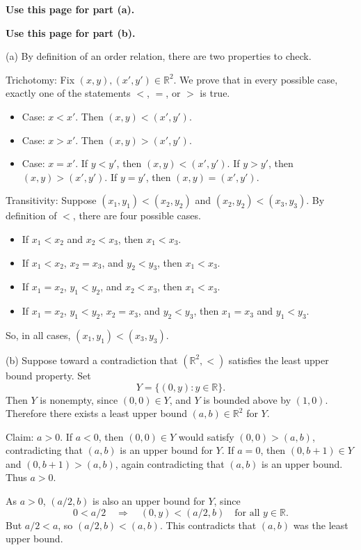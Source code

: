 \documentclass[12pt]{article}
\newcommand{\R}{\mathbb{R}}
\newcommand{\writespace}[1]{\vspace*{#1}}
\newcommand{\fullproofpage}[2]{%
  \begin{tcolorbox}[
    enhanced,
    colback=white,
    colframe=gray!60!black,
    fonttitle=\bfseries,
    title={Pass 5 -- Full Proof Attempt\hfill #1},
    height=8.45in
  ]
  \textbf{#2}

  \writespace{7.65in}
  \end{tcolorbox}
}
\newenvironment{solutionbox}[1]{%
  \begin{tcolorbox}[
    enhanced,
    breakable,
    colback=solgreen,
    colframe=green!45!black,
    fonttitle=\bfseries,
    title={#1}
  ]
}{%
  \end{tcolorbox}
}
\begin{document}
\newpage
\fullproofpage{Homework 3, Problem 2}{Use this page for part (a).}

\newpage
\fullproofpage{Homework 3, Problem 2}{Use this page for part (b).}

\newpage
\begin{solutionbox}{Official Solution (Professor)}
(a) By definition of an order relation, there are two properties to check.

Trichotomy: Fix \((x,y),(x',y')\in\R^2\). We prove that in every possible case, exactly one of the statements \(<\), \(=\), or \(>\) is true.
\begin{itemize}
  \item Case: \(x<x'\). Then \((x,y)<(x',y')\).
  \item Case: \(x>x'\). Then \((x,y)>(x',y')\).
  \item Case: \(x=x'\). If \(y<y'\), then \((x,y)<(x',y')\). If \(y>y'\), then \((x,y)>(x',y')\). If \(y=y'\), then \((x,y)=(x',y')\).
\end{itemize}

Transitivity: Suppose \((x_1,y_1)<(x_2,y_2)\) and \((x_2,y_2)<(x_3,y_3)\). By definition of \(<\), there are four possible cases.
\begin{itemize}
  \item If \(x_1<x_2\) and \(x_2<x_3\), then \(x_1<x_3\).
  \item If \(x_1<x_2\), \(x_2=x_3\), and \(y_2<y_3\), then \(x_1<x_3\).
  \item If \(x_1=x_2\), \(y_1<y_2\), and \(x_2<x_3\), then \(x_1<x_3\).
  \item If \(x_1=x_2\), \(y_1<y_2\), \(x_2=x_3\), and \(y_2<y_3\), then \(x_1=x_3\) and \(y_1<y_3\).
\end{itemize}
So, in all cases, \((x_1,y_1)<(x_3,y_3)\).

(b) Suppose toward a contradiction that \((\R^2,<)\) satisfies the least upper bound property. Set
\[
  Y=\{(0,y):y\in\R\}.
\]
Then \(Y\) is nonempty, since \((0,0)\in Y\), and \(Y\) is bounded above by \((1,0)\). Therefore there exists a least upper bound \((a,b)\in\R^2\) for \(Y\).

Claim: \(a>0\). If \(a<0\), then \((0,0)\in Y\) would satisfy \((0,0)>(a,b)\), contradicting that \((a,b)\) is an upper bound for \(Y\). If \(a=0\), then \((0,b+1)\in Y\) and \((0,b+1)>(a,b)\), again contradicting that \((a,b)\) is an upper bound. Thus \(a>0\).

As \(a>0\), \((a/2,b)\) is also an upper bound for \(Y\), since
\[
  0<a/2 \quad \Longrightarrow \quad (0,y)<(a/2,b)\quad \text{for all }y\in\R.
\]
But \(a/2<a\), so \((a/2,b)<(a,b)\). This contradicts that \((a,b)\) was the least upper bound.
\end{solutionbox}
\end{document}
